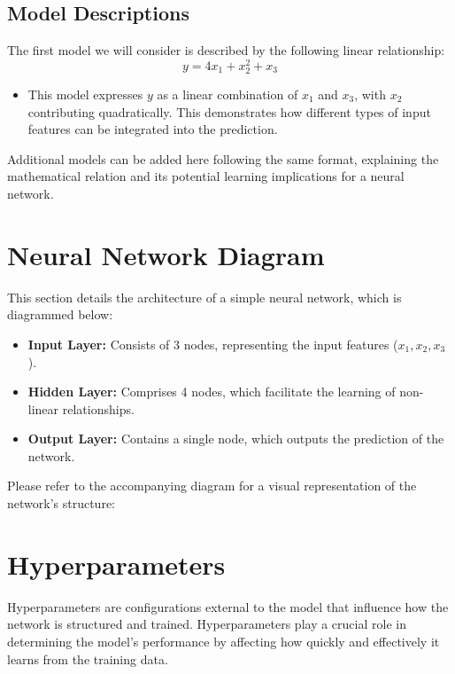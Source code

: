 \documentclass{article}
\begin{document}
\subsection*{Model Descriptions}
The first model we will consider is described by the following linear relationship:
\begin{equation}
    y = 4x_{1} + x_{2}^2 + x_{3}
\end{equation}
\begin{itemize}
    \item This model expresses \(y\) as a linear combination of \(x_1\) and \(x_3\), with \(x_2\) contributing quadratically. This demonstrates how different types of input features can be integrated into the prediction.
\end{itemize}

\vspace{5mm}

\noindent Additional models can be added here following the same format, explaining the mathematical relation and its potential learning implications for a neural network.

\section{Neural Network Diagram}
This section details the architecture of a simple neural network, which is diagrammed below:
\begin{itemize}
    \item \textbf{Input Layer:} Consists of 3 nodes, representing the input features ($x_1, x_2, x_3$).
    \item \textbf{Hidden Layer:} Comprises 4 nodes, which facilitate the learning of non-linear relationships.
    \item \textbf{Output Layer:} Contains a single node, which outputs the prediction of the network.
\end{itemize}
Please refer to the accompanying diagram for a visual representation of the network's structure:

\section{Hyperparameters}
Hyperparameters are configurations external to the model that influence how the network is structured and trained. Hyperparameters play a crucial role in determining the model's performance by affecting how quickly and effectively it learns from the training data.
\end{document}
